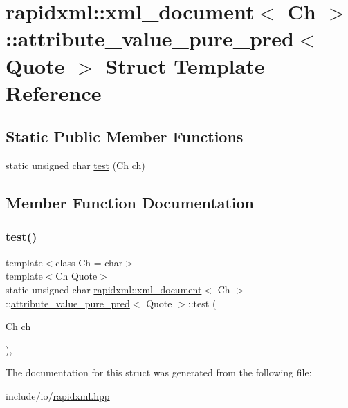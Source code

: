 \hypertarget{structrapidxml_1_1xml__document_1_1attribute__value__pure__pred}{}\section{rapidxml\+::xml\+\_\+document$<$ Ch $>$\+::attribute\+\_\+value\+\_\+pure\+\_\+pred$<$ Quote $>$ Struct Template Reference}
\label{structrapidxml_1_1xml__document_1_1attribute__value__pure__pred}
\subsection*{Static Public Member Functions}
\begin{DoxyCompactItemize}
\item 
static unsigned char \mbox{\hyperlink{structrapidxml_1_1xml__document_1_1attribute__value__pure__pred_a3add4f66f917381562355d5f8b8917c1}{test}} (Ch ch)
\end{DoxyCompactItemize}


\subsection{Member Function Documentation}
\mbox{\label{structrapidxml_1_1xml__document_1_1attribute__value__pure__pred_a3add4f66f917381562355d5f8b8917c1}} 
\subsubsection{\texorpdfstring{test()}{test()}}
{\footnotesize\ttfamily template$<$class Ch = char$>$ \\
template$<$Ch Quote$>$ \\
static unsigned char \mbox{\hyperlink{classrapidxml_1_1xml__document}{rapidxml\+::xml\+\_\+document}}$<$ Ch $>$\+::\mbox{\hyperlink{structrapidxml_1_1xml__document_1_1attribute__value__pure__pred}{attribute\+\_\+value\+\_\+pure\+\_\+pred}}$<$ Quote $>$\+::test (\begin{DoxyParamCaption}\item[{Ch}]{ch }\end{DoxyParamCaption})\hspace{0.3cm}{\ttfamily [inline]}, {\ttfamily [static]}}



The documentation for this struct was generated from the following file\+:\begin{DoxyCompactItemize}
\item 
include/io/\mbox{\hyperlink{rapidxml_8hpp}{rapidxml.\+hpp}}\end{DoxyCompactItemize}
